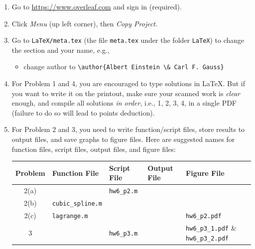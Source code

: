 \begin{enumerate}[label={\arabic*.}]
  \item Go to \url{https://www.overleaf.com} and sign in (required).
  \item Click \emph{Menu} (up left corner), then \emph{Copy Project}.
  \item Go to \verb|LaTeX/meta.tex| (the file \verb|meta.tex| under the folder \verb|LaTeX|) to change the section and your name, e.g.,
    \begin{itemize}
      \item change author to \verb|\author{Albert Einstein \& Carl F. Gauss}|
    \end{itemize}
  \item For Problem 1 and 4, you are encouraged to type solutions in \LaTeX{}. But if you want to write it on the printout, make sure your scanned work is \emph{clear} enough, and compile all solutions \emph{in order}, i.e., 1, 2, 3, 4, in a single PDF (failure to do so will lead to points deduction).
  \item For Problem 2 and 3, you need to write function/script files, store results to output files, and save graphs to figure files. Here are suggested names for function files, script files, output files, and figure files:
    \begin{table}[!hbtp]
      \centering
      \begin{tabular}{cllll}
        \toprule
        Problem & Function File         & Script File     & Output File & Figure File                                 \\
        \midrule
        2(a)    &                       & \verb|hw6_p2.m| &             &                                             \\
        2(b)    & \verb|cubic_spline.m| &                 &             &                                             \\
        2(c)    & \verb|lagrange.m|     &                 &             & \verb|hw6_p2.pdf|                           \\
        3       &                       & \verb|hw6_p3.m| &             & \verb|hw6_p3_1.pdf| \& \verb|hw6_p3_2.pdf|  \\
        \bottomrule
      \end{tabular}
    \end{table}


\end{enumerate}
